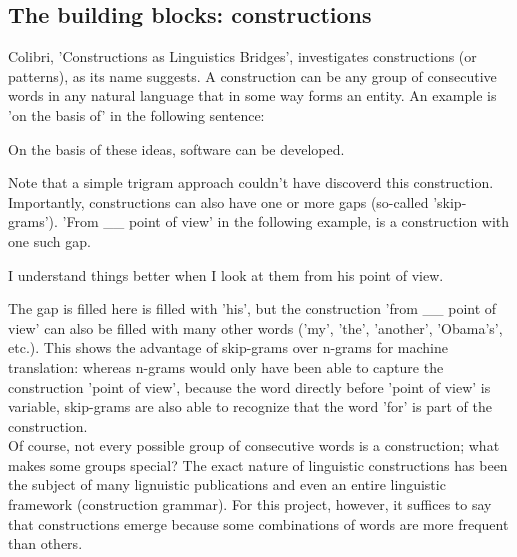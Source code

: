 \documentclass[12pt]{article}
\begin{document}
\subsection{The building blocks: constructions}

Colibri, 'Constructions as Linguistics Bridges', investigates constructions (or patterns), as its name suggests. A construction can be any group of consecutive words in any natural language that in some way forms an entity. An example is 'on the basis of' in the following sentence:

\begin{examples}
\item On the basis of these ideas, software can be developed.
\end{examples}

Note that a simple trigram approach couldn't have discoverd this construction. Importantly, constructions can also have one or more gaps (so-called 'skip-grams'). 'From \_\_ point of view' in the following example, is a construction with one such gap. 

\begin{examples}
\item I understand things better when I look at them from his point of view.
\end{examples}

The gap is filled here is filled with 'his', but the construction 'from \_\_ point of view' can also be filled with many other words ('my', 'the', 'another', 'Obama's', etc.). This shows the advantage of skip-grams over n-grams for machine translation: whereas n-grams would only have been able to capture the construction 'point of view', because the word directly before 'point of view' is variable, skip-grams are also able to recognize that the word 'for' is part of the construction.\\\indent
Of course, not every possible group of consecutive words is a construction; what makes some groups special? The exact nature of linguistic constructions has been the subject of many lignuistic publications and even an entire linguistic framework (construction grammar). For this project, however, it suffices to say that constructions emerge because some combinations of words are more frequent than others.

\end{document}
